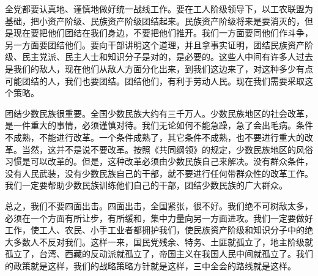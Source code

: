 全党都要认真地、谨慎地做好统一战线工作。要在工人阶级领导下，以工农联盟为基础，把小资产阶级、民族资产阶级团结起来。民族资产阶级将来是要消灭的，但是现在要把他们团结在我们身边，不要把他们推开。我们一方面要同他们作斗争，另一方面要团结他们。要向干部讲明这个道理，并且拿事实证明，团结民族资产阶级、民主党派、民主人士和知识分子是对的，是必要的。这些人中间有许多人过去是我们的敌人，现在他们从敌人方面分化出来，到我们这边来了，对这种多少有点可能团结的人，我们也要团结。团结他们，有利于劳动人民。现在我们需要采取这个策略。

团结少数民族很重要。全国少数民族大约有三千万人。少数民族地区的社会改革，是一件重大的事情，必须谨慎对待。我们无论如何不能急躁，急了会出毛病。条件不成熟，不能进行改革。一个条件成熟了，其它条件不成熟，也不要进行重大的改革。当然，这并不是说不要改革。按照《共同纲领》的规定，少数民族地区的风俗习惯是可以改革的。但是，这种改革必须由少数民族自己来解决。没有群众条件，没有人民武装，没有少数民族自己的干部，就不要进行任何带群众性的改革工作。我们一定要帮助少数民族训练他们自己的干部，团结少数民族的广大群众。

总之，我们不要四面出击。四面出击，全国紧张，很不好。我们绝不可树敌太多，必须在一个方面有所让步，有所缓和，集中力量向另一方面进攻。我们一定要做好工作，使工人、农民、小手工业者都拥护我们，使民族资产阶级和知识分子中的绝大多数人不反对我们。这样一来，国民党残余、特务、土匪就孤立了，地主阶级就孤立了，台湾、西藏的反动派就孤立了，帝国主义在我国人民中间就孤立了。我们的政策就是这样，我们的战略策略方针就是这样，三中全会的路线就是这样。
